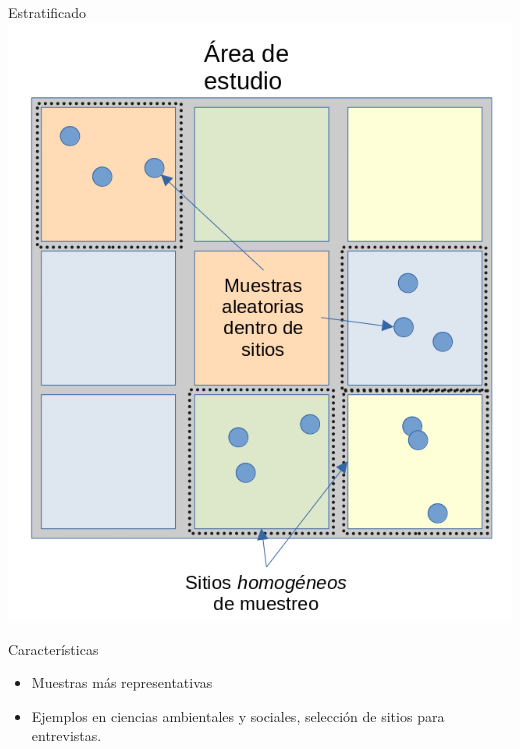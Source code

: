 \documentclass[
  11pt,
  ignorenonframetext,
]{beamer}
\begin{document}
\begin{frame}{Estratificado}
\protect\hypertarget{estratificado}{}
\includegraphics{Figuras-tecnicas/Estratificado.png}
\end{frame}

\begin{frame}{Características}
\protect\hypertarget{caracteruxedsticas}{}
\begin{itemize}
\item
  Muestras más representativas
\item
  Ejemplos en ciencias ambientales y sociales, selección de sitios para
  entrevistas.
\end{itemize}
\end{frame}
\end{document}
